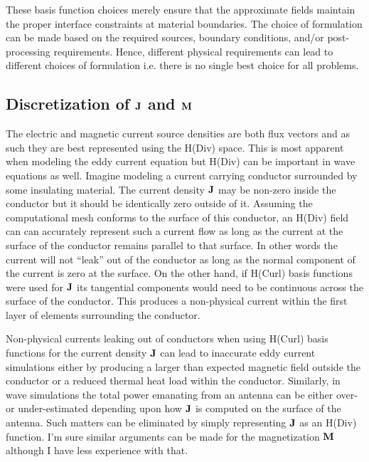 \documentclass[12pt]{article}
\providecommand{\J}{\mbox{\bf J}}
\providecommand{\M}{\mbox{\bf M}}
\begin{document}

These basis function choices merely ensure that the approximate fields
maintain the proper interface constraints at material boundaries. The
choice of formulation can be made based on the required sources,
boundary conditions, and/or post-processing requirements. Hence,
different physical requirements can lead to different choices of
formulation i.e. there is no single best choice for all problems.

\subsection{Discretization of $\J$ and $\M$}

\label{sec:JM}

The electric and magnetic current source densities are both flux
vectors and as such they are best represented using the H(Div)
space. This is most apparent when modeling the eddy current equation
but H(Div) can be important in wave equations as well. Imagine
modeling a current carrying conductor surrounded by some insulating
material. The current density $\J$ may be non-zero inside the
conductor but it should be identically zero outside of it. Assuming
the computational mesh conforms to the surface of this conductor, an
H(Div) field can can accurately represent such a current flow as long
as the current at the surface of the conductor remains parallel to
that surface. In other words the current will not ``leak'' out of the
conductor as long as the normal component of the current is zero at
the surface. On the other hand, if H(Curl) basis functions were used
for $\J$ its tangential components would need to be continuous across
the surface of the conductor. This produces a non-physical current
within the first layer of elements surrounding the conductor.

Non-physical currents leaking out of conductors when using H(Curl)
basis functions for the current density $\J$ can lead to inaccurate
eddy current simulations either by producing a larger than expected
magnetic field outside the conductor or a reduced thermal heat load
within the conductor. Similarly, in wave simulations the total power
emanating from an antenna can be either over- or under-estimated
depending upon how $\J$ is computed on the surface of the
antenna. Such matters can be eliminated by simply representing $\J$ as
an H(Div) function. I'm sure similar arguments can be made for the
magnetization $\M$ although I have less experience with that.
\end{document}
